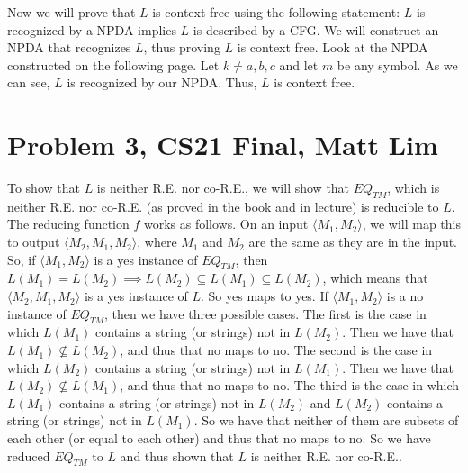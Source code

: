 \documentclass{article}
\begin{document}
Now we will prove that $L$ is context free using the following statement: $L$
is recognized by a NPDA implies $L$ is described by a CFG. We will construct
an NPDA that recognizes $L$, thus proving $L$ is context free.
 Look at the NPDA constructed on the following page. Let $k \neq a,b,c$ and let
 $m$ be any symbol. As we can see, $L$ is recognized by our NPDA. Thus, $L$ is
 context free.
\newpage

\section*{Problem 3, CS21 Final, Matt Lim}
To show that $L$ is neither R.E. nor co-R.E., we will show that $EQ_{TM}$, which
is neither R.E. nor co-R.E. (as proved in the book and in lecture) is
reducible to $L$. The reducing function $f$ works as follows. On an input
$\langle M_1, M_2 \rangle$, we will map this to output $\langle M_2, M_1, M_2
\rangle$, where $M_1$ and $M_2$ are the same as they are in the input. So,
if $\langle M_1, M_2 \rangle$ is a yes instance of $EQ_{TM}$, then
$L(M_1) = L(M_2) \implies L(M_2) \subseteq L(M_1) \subseteq L(M_2)$, which means
that $\langle M_2, M_1, M_2 \rangle$ is a yes instance of $L$. So yes maps to
yes. If $\langle M_1, M_2 \rangle$ is a no instance of $EQ_{TM}$, then we
have three possible cases. The first is the case in which $L(M_1)$ contains a
string (or strings) not in $L(M_2)$. Then we have that $L(M_1) \nsubseteq
L(M_2)$, and thus that no maps to no. The second is the case in which $L(M_2)$
contains a string (or strings) not in $L(M_1)$. Then we have that $L(M_2)
\nsubseteq L(M_1)$, and thus that no maps to no. The third is the case in which
$L(M_1)$ contains a string (or strings) not in $L(M_2)$ and $L(M_2)$ contains
a string (or strings) not in $L(M_1)$. So we have that neither of them are
subsets of each other (or equal to each other) and thus that no maps to no. So
we have reduced $EQ_{TM}$ to $L$ and thus shown that $L$ is neither R.E. nor co-R.E..
\newpage

\end{document}
